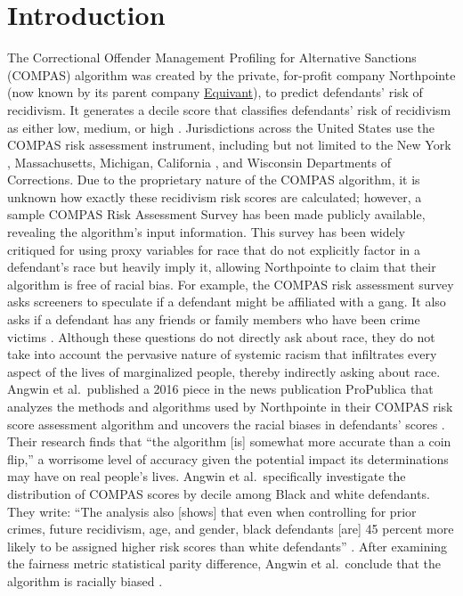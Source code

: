 \documentclass[water,article,submit,moreauthors,pdftex]{mdpi}
\begin{document}

\hypertarget{introduction}{%
\section{Introduction}\label{introduction}}

The Correctional Offender Management Profiling for Alternative Sanctions
(COMPAS) algorithm was created by the private, for-profit company
Northpointe (now known by its parent company
\href{https://www.equivant.com/faq/}{Equivant}), to predict defendants'
risk of recidivism. It generates a decile score that classifies
defendants' risk of recidivism as either low, medium, or high
\citep{angwin2016machine}. Jurisdictions across the United States use
the COMPAS risk assessment instrument, including but not limited to the
New York \citep{NYDOCCS2019}, Massachusetts, Michigan, California
\citep{Jackson2020Setting}, and Wisconsin \citep{WisconsinDOC}
Departments of Corrections. Due to the proprietary nature of the COMPAS
algorithm, it is unknown how exactly these recidivism risk scores are
calculated; however, a sample COMPAS Risk Assessment Survey has been
made publicly available, revealing the algorithm's input information.
This survey has been widely critiqued for using proxy variables for race
that do not explicitly factor in a defendant's race but heavily imply
it, allowing Northpointe to claim that their algorithm is free of racial
bias. For example, the COMPAS risk assessment survey asks screeners to
speculate if a defendant might be affiliated with a gang. It also asks
if a defendant has any friends or family members who have been crime
victims \citep{Angwin2016Sample}. Although these questions do not
directly ask about race, they do not take into account the pervasive
nature of systemic racism that infiltrates every aspect of the lives of
marginalized people, thereby indirectly asking about race. Angwin et
al.~published a 2016 piece in the news publication ProPublica that
analyzes the methods and algorithms used by Northpointe in their COMPAS
risk score assessment algorithm and uncovers the racial biases in
defendants' scores \citep{angwin2016machine}. Their research finds that
``the algorithm {[}is{]} somewhat more accurate than a coin flip,'' a
worrisome level of accuracy given the potential impact its
determinations may have on real people's lives. Angwin et
al.~specifically investigate the distribution of COMPAS scores by decile
among Black and white defendants. They write: ``The analysis also
{[}shows{]} that even when controlling for prior crimes, future
recidivism, age, and gender, black defendants {[}are{]} 45 percent more
likely to be assigned higher risk scores than white defendants''
\citep{larson2016we}. After examining the fairness metric statistical
parity difference, Angwin et al.~conclude that the algorithm is racially
biased \citep{larson2016we}.
\end{document}
